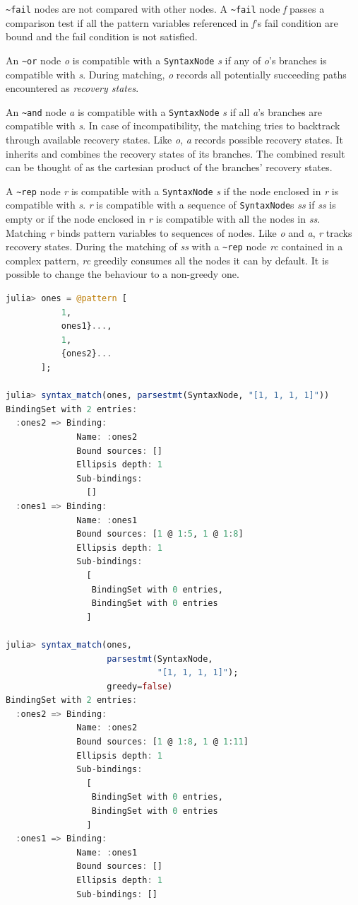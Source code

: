 \documentclass{juliacon}
\begin{document}
\texttt{\textasciitilde{}fail} nodes are not compared with other nodes. A \texttt{\textasciitilde{}fail} node \emph{f}
passes a comparison test if all the pattern variables referenced in
\emph{f}'s fail condition are bound and the fail condition is not
satisfied.

An \texttt{\textasciitilde{}or} node \emph{o} is compatible with a \texttt{SyntaxNode} \emph{s} if any of
\emph{o}'s branches is compatible with \emph{s}. During matching, \emph{o} records
all potentially succeeding paths encountered as \emph{recovery states}.

An \texttt{\textasciitilde{}and} node \emph{a} is compatible with a \texttt{SyntaxNode} \emph{s} if all \emph{a}'s
branches are compatible with \emph{s}. In case of incompatibility, the
matching tries to backtrack through available recovery states. Like
\emph{o}, \emph{a} records possible recovery states. It inherits and combines
the recovery states of its branches. The combined result can be
thought of as the cartesian product of the branches' recovery states.

A \texttt{\textasciitilde{}rep} node \emph{r} is compatible with a \texttt{SyntaxNode} \emph{s} if the node
enclosed in \emph{r} is compatible with \emph{s}. \emph{r} is compatible with a
sequence of \texttt{SyntaxNode}s \emph{ss} if \emph{ss} is empty or if the node
enclosed in \emph{r} is compatible with all the nodes in \emph{ss}. Matching \emph{r}
binds pattern variables to sequences of nodes. Like \emph{o} and \emph{a}, \emph{r}
tracks recovery states. During the matching of \emph{ss} with a \texttt{\textasciitilde{}rep} node
\emph{rc} contained in a complex pattern, \emph{rc} greedily consumes all the
nodes it can by default. It is possible to change the behaviour to a
non-greedy one.

\begin{lstlisting}[language=julia]
julia> ones = @pattern [
           1,
           ones1}...,
           1,
           {ones2}...
       ];

julia> syntax_match(ones, parsestmt(SyntaxNode, "[1, 1, 1, 1]"))
BindingSet with 2 entries:
  :ones2 => Binding:
              Name: :ones2
              Bound sources: []
              Ellipsis depth: 1
              Sub-bindings:
                []
  :ones1 => Binding:
              Name: :ones1
              Bound sources: [1 @ 1:5, 1 @ 1:8]
              Ellipsis depth: 1
              Sub-bindings:
                [
                 BindingSet with 0 entries,
                 BindingSet with 0 entries
                ]

julia> syntax_match(ones,
                    parsestmt(SyntaxNode,
                              "[1, 1, 1, 1]");
                    greedy=false)
BindingSet with 2 entries:
  :ones2 => Binding:
              Name: :ones2
              Bound sources: [1 @ 1:8, 1 @ 1:11]
              Ellipsis depth: 1
              Sub-bindings:
                [
                 BindingSet with 0 entries,
                 BindingSet with 0 entries
                ]
  :ones1 => Binding:
              Name: :ones1
              Bound sources: []
              Ellipsis depth: 1
              Sub-bindings: []
\end{lstlisting}
\end{document}
